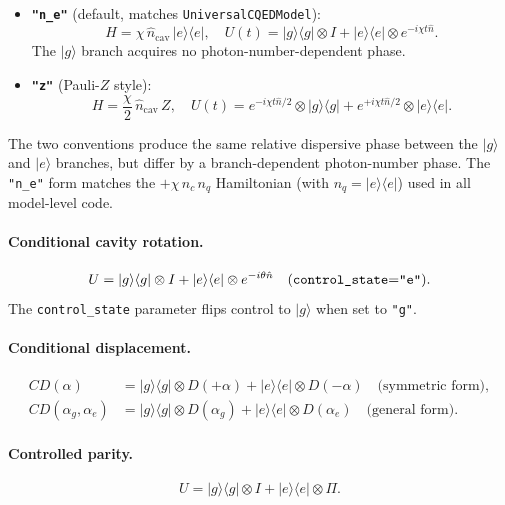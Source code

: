 \documentclass[11pt]{article}
\begin{document}
\begin{itemize}[leftmargin=1.5em]
  \item \textbf{\texttt{"n\_e"}} (default, matches \texttt{UniversalCQEDModel}):
  \[
    H = \chi\,\hat{n}_\text{cav}\,|e\rangle\langle e|,\quad
    U(t) = |g\rangle\langle g|\otimes I + |e\rangle\langle e|\otimes e^{-i\chi t\hat{n}}.
  \]
  The \(|g\rangle\) branch acquires no photon-number-dependent phase.

  \item \textbf{\texttt{"z"}} (Pauli-\(Z\) style):
  \[
    H = \frac{\chi}{2}\,\hat{n}_\text{cav}\,Z,\quad
    U(t) = e^{-i\chi t\hat{n}/2}\otimes|g\rangle\langle g|
           + e^{+i\chi t\hat{n}/2}\otimes|e\rangle\langle e|.
  \]
\end{itemize}

\noindent
The two conventions produce the same relative dispersive phase between the
\(|g\rangle\) and \(|e\rangle\) branches, but differ by a branch-dependent
photon-number phase. The \texttt{"n\_e"} form matches the
\(+\chi\,n_c\,n_q\) Hamiltonian (with \(n_q = |e\rangle\langle e|\))
used in all model-level code.

\paragraph{Conditional cavity rotation.}
\[
  U = |g\rangle\langle g|\otimes I + |e\rangle\langle e|\otimes e^{-i\theta\hat{n}}
  \quad (\text{\texttt{control\_state}=\texttt{"e"}}).
\]
The \texttt{control\_state} parameter flips control to \(|g\rangle\) when
set to \texttt{"g"}.

\paragraph{Conditional displacement.}
\begin{align*}
  CD(\alpha) &= |g\rangle\langle g|\otimes D(+\alpha)
               + |e\rangle\langle e|\otimes D(-\alpha)
               \quad\text{(symmetric form)},\\
  CD(\alpha_g,\alpha_e) &= |g\rangle\langle g|\otimes D(\alpha_g)
               + |e\rangle\langle e|\otimes D(\alpha_e)
               \quad\text{(general form)}.
\end{align*}

\paragraph{Controlled parity.}
\[
  U = |g\rangle\langle g|\otimes I + |e\rangle\langle e|\otimes\Pi.
\]
\end{document}

